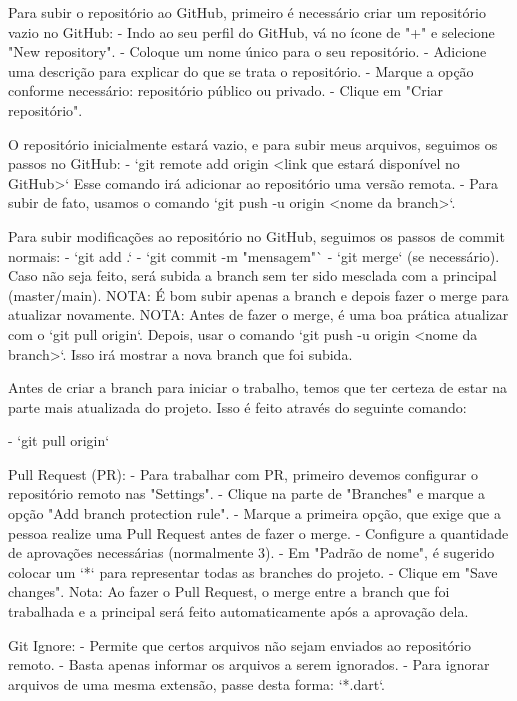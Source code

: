 Para subir o repositório ao GitHub, primeiro é necessário criar um repositório vazio no GitHub:
 - Indo ao seu perfil do GitHub, vá no ícone de "+" e selecione "New repository".
 - Coloque um nome único para o seu repositório.
 - Adicione uma descrição para explicar do que se trata o repositório.
 - Marque a opção conforme necessário: repositório público ou privado.
 - Clique em "Criar repositório".

O repositório inicialmente estará vazio, e para subir meus arquivos, seguimos os passos no GitHub:
 - `git remote add origin <link que estará disponível no GitHub>`
   Esse comando irá adicionar ao repositório uma versão remota.
 - Para subir de fato, usamos o comando `git push -u origin <nome da branch>`.

Para subir modificações ao repositório no GitHub, seguimos os passos de commit normais:
    - `git add .`
    - `git commit -m "mensagem"`
    - `git merge` (se necessário). Caso não seja feito, será subida a branch sem ter sido mesclada com a principal (master/main).
    NOTA: É bom subir apenas a branch e depois fazer o merge para atualizar novamente.
    NOTA: Antes de fazer o merge, é uma boa prática atualizar com o `git pull origin`.
    Depois, usar o comando `git push -u origin <nome da branch>`.
    Isso irá mostrar a nova branch que foi subida.

Antes de criar a branch para iniciar o trabalho, temos que ter certeza de estar na parte
mais atualizada do projeto. Isso é feito através do seguinte comando:

   - `git pull origin`

Pull Request (PR):
   - Para trabalhar com PR, primeiro devemos configurar o repositório remoto nas "Settings".
   - Clique na parte de "Branches" e marque a opção "Add branch protection rule".
   - Marque a primeira opção, que exige que a pessoa realize uma Pull Request antes de fazer o merge.
   - Configure a quantidade de aprovações necessárias (normalmente 3).
   - Em "Padrão de nome", é sugerido colocar um `*` para representar todas as branches do projeto.
   - Clique em "Save changes".
   Nota: Ao fazer o Pull Request, o merge entre a branch que foi trabalhada e a principal será feito automaticamente
   após a aprovação dela.

Git Ignore:
   - Permite que certos arquivos não sejam enviados ao repositório remoto.
   - Basta apenas informar os arquivos a serem ignorados.
   - Para ignorar arquivos de uma mesma extensão, passe desta forma: `*.dart`.